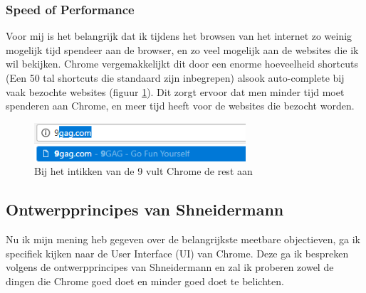 \documentclass[12pt]{article}
\begin{document}
\subsubsection{Speed of Performance}
Voor mij is het belangrijk dat ik tijdens het browsen van het internet zo weinig mogelijk tijd spendeer aan de browser, en zo veel mogelijk aan de websites die ik wil bekijken. Chrome vergemakkelijkt dit door een enorme hoeveelheid shortcuts (Een 50 tal shortcuts die standaard zijn inbegrepen\cite{shortcuts}) alsook auto-complete bij vaak bezochte websites (figuur \ref{fig:autocomplete}). Dit zorgt ervoor dat men minder tijd moet spenderen aan Chrome, en meer tijd heeft voor de websites die bezocht worden.
\begin{figure}
	\centering
	\includegraphics[width=0.7\textwidth]{autocomplete.png}
	\caption{Bij het intikken van de 9 vult Chrome de rest aan}
	\label{fig:autocomplete}
\end{figure}

\subsection{Ontwerpprincipes van Shneidermann}
Nu ik mijn mening heb gegeven over de belangrijkste meetbare objectieven, ga ik specifiek kijken naar de User Interface (UI) van Chrome. Deze ga ik bespreken volgens de ontwerpprincipes van Shneidermann en zal ik proberen zowel de dingen die Chrome goed doet en minder goed doet te belichten.
\end{document}
